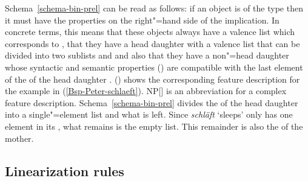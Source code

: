 Schema~\ref{schema-bin-prel} can be read as follows: if an object is of the type  then it must have the properties
on the right"=hand side of the implication. In concrete terms, this means that these objects always have a valence list which corresponds to 
, that they have a head daughter with a valence list that can be divided into two sublists   and  and
also that they have a non"=head daughter whose syntactic and semantic properties (\synsemv) are compatible with the last element of the
\subcatl of the head daughter . () shows the corresponding feature description for the example in (\ref{Bsp-Peter-schlaeft}). 
\ea
{}
\z
NP[] is an abbreviation for a complex feature description. Schema~\ref{schema-bin-prel} divides the \subcatl of the head daughter into
a single"=element list and what is left. Since \emph{schläft} `sleeps' only has one element in its \subcatl, what remains is the empty list.
This remainder is also the \subcatv of the mother.

\subsection{Linearization rules}
\label{Abschnitt-LP-Regeln-HPSG}

